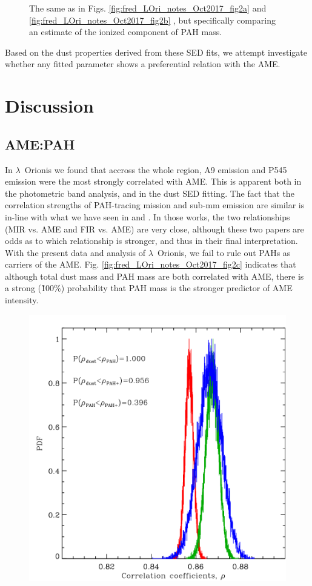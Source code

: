 {\begin{figure}
                \centering
                \caption{ The same as in Figs. \ref{fig:fred_LOri_notes_Oct2017_fig2a} and \ref{fig:fred_LOri_notes_Oct2017_fig2b} , but specifically comparing an estimate of the ionized component of PAH mass. }
                \label{fig:fred_LOri_notes_Oct2017_fig2d}
              \end{figure}
    Based on the dust properties derived from these SED fits, we attempt investigate whether any fitted parameter shows a preferential relation with the AME.

  \section{Discussion}
    \subsection{AME:PAH}
      In  $\lambda$~Orionis we found that accross the whole region, A9 emission and P545 emission were the most strongly correlated with AME. This is apparent both in the photometric band analysis, and in the dust SED fitting.  The fact that the correlation strengths of PAH-tracing mission and sub-mm emission are similar is in-line with what we have seen in \cite{ysard10b} and \cite{hensley16}. In those works, the two relationships (MIR vs. AME and FIR vs. AME) are very close, although these two papers are odds as to which relationship is stronger, and thus in their final interpretation. With the present data and analysis of $\lambda$~Orionis, we fail to rule out PAHs as carriers of the AME. Fig. \ref{fig:fred_LOri_notes_Oct2017_fig2c} indicates that although total dust mass and PAH mass are both correlated with AME, there is a strong (\~100\%) probability that PAH mass is the stronger predictor of AME intensity.
          \begin{figure}
            \includegraphics[width=\textwidth/2]{../Plots/ch_lori/fred_LOri_notes_Oct2017_fig2c.pdf}

\end{figure}}
